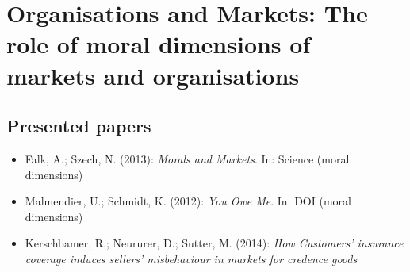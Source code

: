 

\chapter{Organisations and Markets: The role of moral dimensions of markets and organisations}

\section{Presented papers}

\begin{itemize}
	\item Falk, A.; Szech, N. (2013): \textit{Morals and Markets}. In: Science (moral dimensions)
	\item Malmendier, U.; Schmidt, K. (2012): \textit{You Owe Me}. In: DOI (moral dimensions)
	\item Kerschbamer, R.; Neururer, D.; Sutter, M. (2014): \textit{How Customers' insurance coverage induces sellers' misbehaviour in markets for credence goods}
\end{itemize}

\newpage